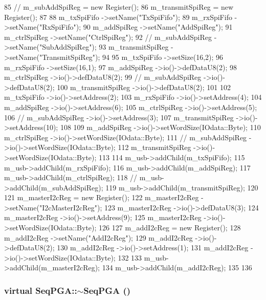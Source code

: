 \begin{DoxyCode}
{85   //  m_subAddSpiReg      = new Register();
86   m_transmitSpiReg    = new Register();
87   
88   m_txSpiFifo       ->setName("TxSpiFifo");
89   m_rxSpiFifo       ->setName("RxSpiFifo");
90   m_addSpiReg       ->setName("AddSpiReg");
91   m_ctrlSpiReg      ->setName("CtrlSpiReg");
92   //  m_subAddSpiReg    ->setName("SubAddSpiReg");
93   m_transmitSpiReg  ->setName("TransmitSpiReg");
94   
95   m_txSpiFifo       ->setSize(16,2);
96   m_rxSpiFifo       ->setSize(16,1);
97   m_addSpiReg       ->io()->defDataU8(2);
98   m_ctrlSpiReg      ->io()->defDataU8(2);
99   //  m_subAddSpiReg    ->io()->defDataU8(2);
100   m_transmitSpiReg  ->io()->defDataU8(2);
101   
102   m_txSpiFifo       ->io()->setAddress(2);
103   m_rxSpiFifo       ->io()->setAddress(4);
104   m_addSpiReg       ->io()->setAddress(6);
105   m_ctrlSpiReg      ->io()->setAddress(5);
106   //  m_subAddSpiReg    ->io()->setAddress(3);
107   m_transmitSpiReg  ->io()->setAddress(10);
108   
109   m_addSpiReg       ->io()->setWordSize(IOdata::Byte);
110   m_ctrlSpiReg      ->io()->setWordSize(IOdata::Byte);
111   //  m_subAddSpiReg    ->io()->setWordSize(IOdata::Byte);
112   m_transmitSpiReg  ->io()->setWordSize(IOdata::Byte);
113   
114   m_usb->addChild(m_txSpiFifo);  
115   m_usb->addChild(m_rxSpiFifo);     
116   m_usb->addChild(m_addSpiReg);     
117   m_usb->addChild(m_ctrlSpiReg);     
118   //  m_usb->addChild(m_subAddSpiReg);   
119   m_usb->addChild(m_transmitSpiReg);
120 
121   m_masterI2cReg    = new Register();
122   m_masterI2cReg    ->setName("I2cMasterI2cReg");
123   m_masterI2cReg    ->io()->defDataU8(3);
124   m_masterI2cReg    ->io()->setAddress(9);
125   m_masterI2cReg    ->io()->setWordSize(IOdata::Byte);
126 
127   m_addI2cReg       = new Register();
128   m_addI2cReg       ->setName("AddI2cReg");
129   m_addI2cReg       ->io()->defDataU8(2);
130   m_addI2cReg       ->io()->setAddress(1);
131   m_addI2cReg       ->io()->setWordSize(IOdata::Byte);
132 
133   m_usb->addChild(m_masterI2cReg);  
134   m_usb->addChild(m_addI2cReg);     
135 
136 }
\end{DoxyCode}
\hypertarget{classSeqPGA_ac36a18cf2f56796a78fb91a1afc5cc1b}{
\subsubsection[{$\sim$SeqPGA}]{\setlength{\rightskip}{0pt plus 5cm}virtual SeqPGA::$\sim$SeqPGA ()}}
\label{classSeqPGA_ac36a18cf2f56796a78fb91a1afc5cc1b}


